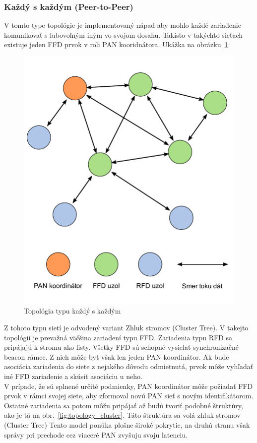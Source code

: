 \subsubsection{Každý s každým (Peer-to-Peer)}
\indent\indent V tomto type topológie je implementovaný nápad aby mohlo každé zariadenie komunikovať s ľubovoľným iným vo svojom dosahu. Takisto v takýchto sieťach existuje jeden FFD prvok v roli PAN kooridnátora. Ukážka na obrázku~\ref{fig:topology_p2p}.\\

\begin{figure}[htbp]
\begin{center}
\includegraphics[width=120mm]{figures/topology_p2p}
\caption{Topológia typu každý s každým}
\label{fig:topology_p2p}
\end{center}
\end{figure} 

\indent Z tohoto typu sietí je odvodený variant Zhluk stromov (Cluster Tree). V takejto topológii je prevažná väčšina zariadení typu FFD. Zariadenia typu RFD sa pripájajú k stromu ako listy. Všetky FFD sú schopné vysielať synchronizačné beacon rámce. Z nich môže byť však len jeden PAN koordinátor. Ak bude asociácia zariadenia do siete z nejakého dôvodu odmietnutá, prvok môže vyhľadať iné FFD zariadenie a skúsiť asociáciu u neho.\\
\indent V prípade, že sú splnené určité podmienky, PAN koordinátor môže požiadať FFD prvok v rámci svojej siete, aby  zformoval novú PAN sieť s novým identifikátorom. Ostatné zariadenia sa potom môžu pripájať až budú tvoriť podobné štruktúry, ako je tá na obr.~\ref{fig:topology_cluster}. Táto štruktúra sa volá zhluk stromov (Cluster Tree) Tento model ponúka plošne široké pokrytie, na druhú stranu však správy pri prechode cez viaceré PAN zvyšuju svoju latenciu.\\

